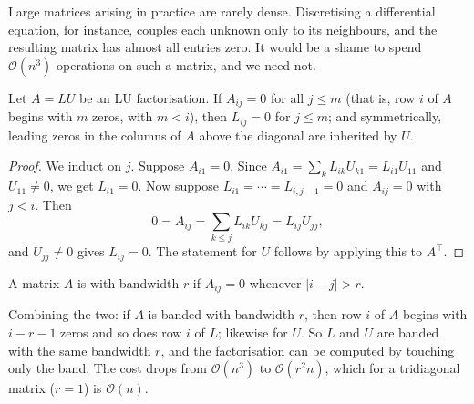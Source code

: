 \documentclass[a4paper]{scrartcl}
\providecommand{\abs}[1]{\left\lvert#1\right\rvert}
\renewcommand{\abs}[1]{\left\lvert#1\right\rvert}
\begin{document}
Large matrices arising in practice are rarely dense. Discretising a differential equation, for instance, couples each unknown only to its neighbours, and the resulting matrix has almost all entries zero. It would be a shame to spend $\mathcal{O}(n^3)$ operations on such a matrix, and we need not.

\begin{theorem}\label{thm:inherit}
  Let $A = LU$ be an LU factorisation. If $A_{ij} = 0$ for all $j \le m$ (that is, row $i$ of $A$ begins with $m$ zeros, with $m < i$), then $L_{ij} = 0$ for $j \le m$; and symmetrically, leading zeros in the columns of $A$ above the diagonal are inherited by $U$.
\end{theorem}
\begin{proof}
  We induct on $j$. Suppose $A_{i1} = 0$. Since $A_{i1} = \sum_k L_{ik}U_{k1} = L_{i1}U_{11}$ and $U_{11}\neq 0$, we get $L_{i1} = 0$. Now suppose $L_{i1} = \cdots = L_{i,j-1} = 0$ and $A_{ij} = 0$ with $j < i$. Then
  $$
  0 = A_{ij} = \sum_{k\leq j}L_{ik}U_{kj} = L_{ij}U_{jj},
  $$
  and $U_{jj}\neq 0$ gives $L_{ij} = 0$. The statement for $U$ follows by applying this to $A^\top$.
\end{proof}

\begin{definition}
  A matrix $A$ is  with bandwidth $r$ if $A_{ij} = 0$ whenever $\abs{i-j} > r$.
\end{definition}

Combining the two: if $A$ is banded with bandwidth $r$, then row $i$ of $A$ begins with $i - r - 1$ zeros and so does row $i$ of $L$; likewise for $U$. So $L$ and $U$ are banded with the same bandwidth $r$, and the factorisation can be computed by touching only the band. The cost drops from $\mathcal{O}(n^3)$ to $\mathcal{O}(r^2 n)$, which for a tridiagonal matrix ($r=1$) is $\mathcal{O}(n)$.
\end{document}
